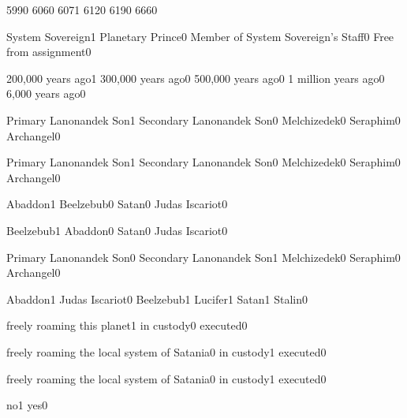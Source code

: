
{599}{0}
{606}{0}
{607}{1}
{612}{0}
{619}{0}
{666}{0}
\qstop

{System Sovereign}{1}
{Planetary Prince}{0}
{Member of System Sovereign's Staff}{0}
{Free from assignment}{0}
\qstop

{200,000 years ago}{1}
{300,000 years ago}{0}
{500,000 years ago}{0}
{1 million years ago}{0}
{6,000 years ago}{0}
\qstop

{Primary Lanonandek Son}{1}
{Secondary Lanonandek Son}{0}
{Melchizedek}{0}
{Seraphim}{0}
{Archangel}{0}
\qstop

{Primary Lanonandek Son}{1}
{Secondary Lanonandek Son}{0}
{Melchizedek}{0}
{Seraphim}{0}
{Archangel}{0}
\qstop

{Abaddon}{1}
{Beelzebub}{0}
{Satan}{0}
{Judas Iscariot}{0}
\qstop

{Beelzebub}{1}
{Abaddon}{0}
{Satan}{0}
{Judas Iscariot}{0}
\qstop

{Primary Lanonandek Son}{0}
{Secondary Lanonandek Son}{1}
{Melchizedek}{0}
{Seraphim}{0}
{Archangel}{0}
\qstop

{Abaddon}{1}
{Judas Iscariot}{0}
{Beelzebub}{1}
{Lucifer}{1}
{Satan}{1}
{Stalin}{0}
\qstop

{freely roaming this planet}{1}
{in custody}{0}
{executed}{0}
\qstop

{freely roaming the local system of Satania}{0}
{in custody}{1}
{executed}{0}
\qstop

{freely roaming the local system of Satania}{0}
{in custody}{1}
{executed}{0}
\qstop




{no}{1}
{yes}{0}
\qstop

